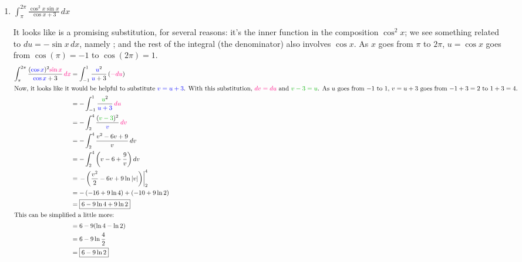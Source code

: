 \documentclass{article}
\begin{document}
\begin{enumerate}
\begin{enumerate}
    \item
      \begin{problem}[\vfill\newpage]
        $\displaystyle \int_\pi^{2 \pi} \frac{\cos^2 x \sin x}{\cos x +
          3}\,dx$
      \end{problem}

      \begin{solution} 
        It looks like  is a promising substitution, for
        several reasons: it's the inner function in the composition
        $\cos^2 x$; we see something related to $du = - \sin x\,dx$,
        namely ; and the rest of the integral
        (the denominator) also involves $\cos x$.  As $x$ goes from $\pi$
        to $2 \pi$, $u = \cos x$ goes from $\cos(\pi) = -1$ to $\cos(2
        \pi) = 1$.
        \begin{align*}
          \int_\pi^{2 \pi} \frac{(\sub{\cos x})^2 \subd{\sin x}}{\sub{\cos
              x} + 3}\,\subd{dx} &= \int_{-1}^1 \frac{\sub{u}^2}{\sub{u} +
            3}\,
          (\subd{-du}) \\
          \intertext{Now, it looks like it would be helpful to substitute
            \sub{$v = u + 3$}.  With this substitution, \subd{$dv = du$}
            and \sube{$v - 3 = u$}.  As $u$ goes from $-1$ to $1$, $v = u
            + 3$ goes from $-1 + 3 = 2$ to $1 + 3 = 4$.} %
          &= - \int_{-1}^1 \frac{\sube{u}^2}{\sub{u + 3}}\,\subd{du} \\
          &= - \int_2^4 \frac{(\sube{v - 3})^2}{\sub{v}}\,\subd{dv} \\
          &= - \int_2^4 \frac{v^2 - 6v + 9}{v}\,dv \\
          &= - \int_2^4 \left( v - 6 + \frac{9}{v} \right) dv \\
          &= \left. - \left( \frac{v^2}{2} - 6v + 9 \ln |v| \right)
          \right|_2^4 \\
          &= - \left( - 16 + 9 \ln 4 \right) + \left( -10 + 9 \ln 2
          \right) \\
          &= \boxed{6 - 9 \ln 4 + 9 \ln 2} \\
          \intertext{This can be simplified a little more:}
          &= {6 - 9 (\ln 4 - \ln 2)} \\
          &= 6 - 9 \ln \frac{4}{2} \\
          &= \boxed{6 - 9 \ln 2}
        \end{align*}
      \end{solution}

    \end{enumerate}


\end{enumerate}
\end{document}
